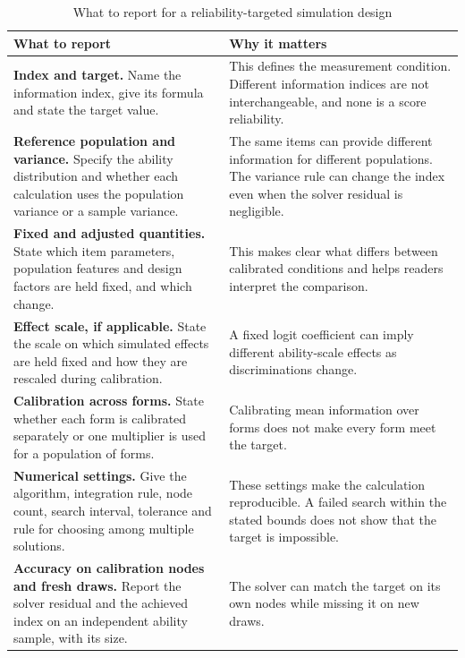 \begin{table}[!htb]
\centering
\caption{What to report for a reliability-targeted simulation design}
\label{tab:checklist}
\footnotesize
\setlength{\tabcolsep}{6pt}
\begin{tabularx}{\textwidth}{@{}>{\raggedright\arraybackslash}p{}>{\raggedright\arraybackslash}X@{}}
\toprule
\textbf{What to report} & \textbf{Why it matters} \\
\midrule
\textbf{Index and target.} Name the information index, give its formula and state the target value. & This defines the measurement condition. Different information indices are not interchangeable, and none is a score reliability. \\
\addlinespace[4pt]
\textbf{Reference population and variance.} Specify the ability distribution and whether each calculation uses the population variance or a sample variance. & The same items can provide different information for different populations. The variance rule can change the index even when the solver residual is negligible. \\
\addlinespace[4pt]
\textbf{Fixed and adjusted quantities.} State which item parameters, population features and design factors are held fixed, and which change. & This makes clear what differs between calibrated conditions and helps readers interpret the comparison. \\
\addlinespace[4pt]
\textbf{Effect scale, if applicable.} State the scale on which simulated effects are held fixed and how they are rescaled during calibration. & A fixed logit coefficient can imply different ability-scale effects as discriminations change. \\
\addlinespace[4pt]
\textbf{Calibration across forms.} State whether each form is calibrated separately or one multiplier is used for a population of forms. & Calibrating mean information over forms does not make every form meet the target. \\
\addlinespace[4pt]
\textbf{Numerical settings.} Give the algorithm, integration rule, node count, search interval, tolerance and rule for choosing among multiple solutions. & These settings make the calculation reproducible. A failed search within the stated bounds does not show that the target is impossible. \\
\addlinespace[4pt]
\textbf{Accuracy on calibration nodes and fresh draws.} Report the solver residual and the achieved index on an independent ability sample, with its size. & The solver can match the target on its own nodes while missing it on new draws. \\

\end{tabularx}
\end{table}
